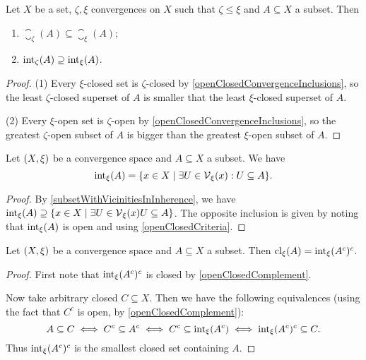 \begin{lemma} \label{interiorClosureMonotoneInConvergence}
Let $X$ be a set, $\zeta, \xi$ convergences on $X$ such that $\zeta\leq \xi$ and $A\subseteq X$ a subset. Then
\begin{enumerate}
\item $\closure_\zeta(A) \subseteq \closure_
\xi(A)$;
\item $\operatorname{int}_\zeta(A) \supseteq \operatorname{int}_
\xi(A)$.
\end{enumerate}
\end{lemma}
\begin{proof}
(1) Every $\xi$-closed set is $\zeta$-closed by \ref{openClosedConvergenceInclusions}, so the least $\zeta$-closed superset of $A$ is smaller that the least $\xi$-closed superset of $A$.

(2) Every $\xi$-open set is $\zeta$-open by \ref{openClosedConvergenceInclusions}, so the greatest $\zeta$-open subset of $A$ is bigger than the greatest $\xi$-open subset of $A$.
\end{proof}

\begin{proposition}
Let $\sSet{X,\xi}$ be a convergence space and $A\subseteq X$ a subset. We have
\[ \interior_\xi(A) = \setbuilder{x\in X}{\exists U\in \vicinities_\xi(x): U\subseteq A}. \]
\end{proposition}
\begin{proof}
By \ref{subsetWithVicinitiesInInherence}, we have $\interior_\xi(A) \supseteq \setbuilder{x\in X}{\exists U\in \vicinities_\xi(x) U\subseteq A}$. The opposite inclusion is given by noting that $\operatorname{int}_\xi(A)$ is open and using \ref{openClosedCriteria}.
\end{proof}

\begin{lemma} \label{interiorClosureComplement}
Let $\sSet{X,\xi}$ be a convergence space and $A\subseteq X$ a subset. Then $\operatorname{cl}_\xi(A) = \operatorname{int}_\xi(A^c)^c$.
\end{lemma}
\begin{proof}
First note that $\operatorname{int}_\xi(A^c)^c$ is closed by \ref{openClosedComplement}.

Now take arbitrary closed $C\subseteq X$. Then we have the following equivalences (using the fact that $C^c$ is open, by \ref{openClosedComplement}):
\[ A\subseteq C \iff C^c \subseteq A^c \iff C^c \subseteq \operatorname{int}_\xi(A^c) \iff \operatorname{int}_\xi(A^c)^c\subseteq C. \]
Thus $\operatorname{int}_\xi(A^c)^c$ is the smallest closed set containing $A$.
\end{proof}

